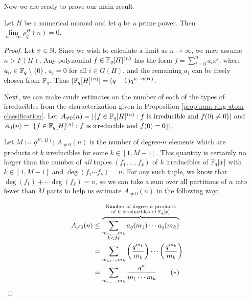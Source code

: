 Now we are ready to prove our main result.

\begin{thm} \label{thm:zero-asymptotic density}
	Let $H$ be a numerical monoid and let $q$ be a prime power.
	Then $\lim\limits_{n\to\infty} \rho_q^H(n) = 0$.
\end{thm}

\begin{proof}
	Let $n\in \mathbb{N}$.
	Since we wish to calculate a limit as $n\to\infty$, we may assume $n> F(H)$.
	Any polynomial $f\in \mathbb{F}_q[H]^{(n)}$ has the form $f = \sum_{i=0}^n a_i x^i$, where $a_n \in \mathbb{F}_q\setminus\{0\}$, $a_i = 0$ for all $i\in G(H)$, and the remaining $a_i$ can be freely chosen from $\mathbb{F}_q$.
	Thus $|\mathbb{F}_q[H]^{(n)}| = (q-1)q^{n-g(H)}$.
	
	Next, we can make crude estimates on the number of each of the types of irreducibles from the characterization given in Proposition \ref{prop:num ring atom classification}.
	Let 
	$A_{\neq0}(n) = | \{f\in \mathbb{F}_q[H]^{(n)}:  f \textrm{ is irreducible and } f(0)\neq 0\}|$ and
	$A_{0}(n) = | \{f\in \mathbb{F}_q[H]^{(n)}:  f \textrm{ is irreducible and } f(0) = 0\}|$.
	
	Let $M := q^{F(H)}$; $A_{\neq0}(n)$ is the number of degree-$n$ elements which are products of $k$ irreducibles for some $k\in [1,M-1]$.
	This quantity is certainly no larger than the number of \textit{all} tuples $(f_1,\dots,f_k)$ of $k$ irreducibles of $\mathbb{F}_q[x]$ with $k\in [1,M-1]$ and $\deg(f_1\cdots f_k) = n$.
	For any such tuple, we know that $\deg(f_1) + \cdots \deg(f_k) = n$, so we can take a sum over all partitions of $n$ into fewer than $M$ parts to help us estimate $A_{\neq0}(n)$ in the following way:
	
	\begin{align*}
	A_{\neq0}(n) &\le 
	\overbrace{\sum_{\substack{m_1,\dots, m_k \\ k < M}} a_q(m_1)\cdots a_q(m_k)}^{\substack{\textrm{Number of degree $n$ products} \\ \textrm{of $k$ irreducibles of $\mathbb{F}_q[x]$}}} \\
	&= \sum_{m_1,\dots,m_k} \left(\frac{q^{m_1}}{m_1}\right)\cdots \left(\frac{q^{m_k}}{m_k}\right) \\
	&=  \sum_{m_1,\dots,m_k} \frac{q^n}{m_1\cdots m_k} \tag{$*$}
	\end{align*}
	

\end{proof}
